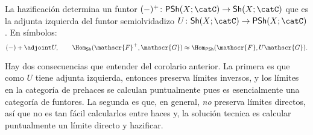 \begin{cor}
	La hazificación determina un funtor $(-)^+ \colon \mathsf{PSh}(X; \catC) \to \mathsf{Sh}(X; \catC)$ que es la adjunta izquierda
	del funtor semiolvidadizo $U \colon \mathsf{Sh}(X; \catC) \to \mathsf{PSh}(X; \catC)$. En símbolos:
	$$ (-)+ \adjoint U, \qquad \Hom_{\mathsf{Sh}}(\mathscr{F}^+ , \mathscr{G}) \approx \Hom_{\mathsf{PSh}}(\mathscr{F}, U\mathscr{G}). $$
\end{cor}
Hay dos consecuencias que entender del corolario anterior.
La primera es que como $U$ tiene adjunta izquierda, entonces preserva límites inversos, y los límites en la categoría de prehaces se calculan
puntualmente pues es esencialmente una categoría de funtores.
La segunda es que, en general, \textit{no} preserva límites directos, así que no es tan fácil calcularlos entre haces y, la solución tecnica
es calcular puntualmente un límite directo y hazificar.

